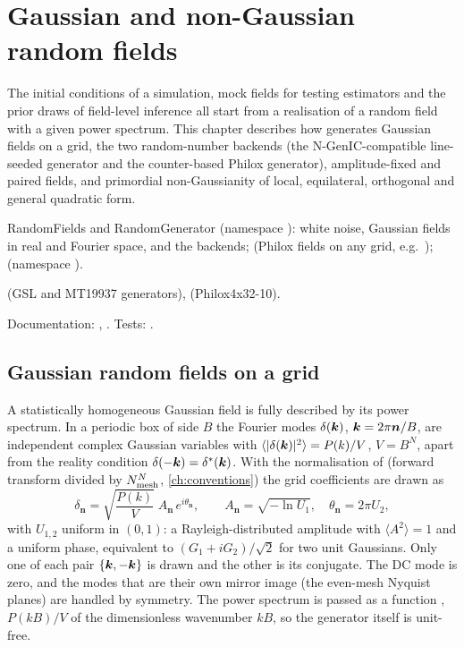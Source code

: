 \chapter{Gaussian and non-Gaussian random fields}\label{ch:random-fields}

The initial conditions of a simulation, mock fields for testing estimators and the prior draws of field-level
inference all start from a realisation of a random field with a given power spectrum. This chapter describes how \fml{}
generates Gaussian fields on a grid, the two random-number backends (the N-GenIC-compatible line-seeded generator and
the counter-based Philox generator), amplitude-fixed and paired fields, and primordial non-Gaussianity of local,
equilateral, orthogonal and general quadratic form.

\begin{modulebox}{RandomFields and RandomGenerator}
 (namespace ): white noise, Gaussian fields in
real and Fourier space,  and the backends;
 (Philox fields on any grid, e.g.\ );
 (namespace ).\par
{} (GSL and MT19937 generators), 
(Philox4x32-10).\par
Documentation: , . Tests:
.
\end{modulebox}

\section{Gaussian random fields on a grid}\label{sec:rf-gaussian}

A statistically homogeneous Gaussian field is fully described by its power spectrum. In a periodic box of side $B$
the Fourier modes $\delta(\bm{k})$, $\bm{k}=2\pi\bm n/B$, are independent complex Gaussian variables with
$\langle|\delta(\bm{k})|^2\rangle=P(k)/V$, $V=B^N$, apart from the reality condition $\delta(-\bm{k})=\delta^*(\bm{k})$. With the
normalisation of  (forward transform divided by $N_{\rm mesh}^N$, \cref{ch:conventions}) the grid
coefficients are drawn as
\begin{equation}
\delta_{\bm n}=\sqrt{\frac{P(k)}{V}}\;A_{\bm n}\,e^{i\theta_{\bm n}},\qquad
A_{\bm n}=\sqrt{-\ln U_1},\quad \theta_{\bm n}=2\pi U_2,
\label{eq:rf-mode}
\end{equation}
with $U_{1,2}$ uniform in $(0,1)$: a Rayleigh-distributed amplitude with $\langle A^2\rangle=1$ and a uniform phase,
equivalent to $(G_1+iG_2)/\sqrt2$ for two unit Gaussians. Only one of each pair $\{\bm{k},-\bm{k}\}$ is drawn and the other
is its conjugate. The DC mode is zero, and the modes that are their own mirror image (the even-mesh Nyquist planes)
are handled by symmetry. The power spectrum is passed as a function , $P(kB)/V$ of the
dimensionless wavenumber $kB$, so the generator itself is unit-free.

